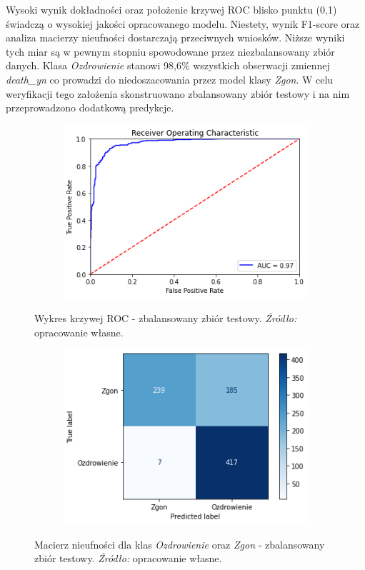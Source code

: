 \documentclass[polish, twoside, 12pt, a4paper]{article}
\theoremstyle{definition}
\theoremstyle{plain}
\theoremstyle{remark}
\begin{document}
Wysoki wynik dokładności oraz położenie krzywej ROC blisko punktu (0,1) świadczą o wysokiej jakości opracowanego modelu. Niestety, wynik F1-score oraz analiza macierzy nieufności dostarczają przeciwnych wniosków. Niższe wyniki tych miar są w pewnym stopniu spowodowane przez niezbalansowany zbiór danych. Klasa \emph{Ozdrowienie} stanowi 98,6\% wszystkich obserwacji zmiennej \emph{death\_yn} co prowadzi do niedoszacowania przez model klasy \emph{Zgon}. W celu weryfikacji tego założenia skonstruowano zbalansowany zbiór testowy i na nim przeprowadzono dodatkową predykcje. 

\begin{figure}[H]
  \centering
  \begin{subfigure}[t]{\textwidth}
	\centering
    \includegraphics[width=10cm]{roc-bs.png}
  \end{subfigure}
  \captionsetup{margin=10pt,font=small,labelfont=bf,width=.8\textwidth}
  \caption{Wykres krzywej ROC - zbalansowany zbiór testowy. \textit{Źródło:} opracowanie własne.}
\end{figure}

\begin{figure}[H]
  \centering
  \begin{subfigure}[t]{\textwidth}
	\centering
    \includegraphics[width=10cm]{conf_matrix_balanced.png}
  \end{subfigure}
  \captionsetup{margin=10pt,font=small,labelfont=bf,width=.8\textwidth}
  \caption{Macierz nieufności dla klas \emph{Ozdrowienie} oraz \emph{Zgon} - zbalansowany zbiór testowy. \textit{Źródło:} opracowanie własne.}
\end{figure}
\end{document}
